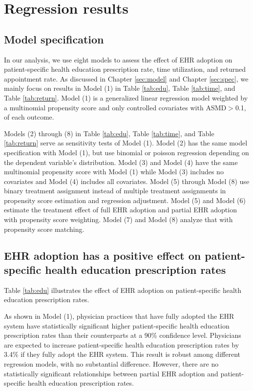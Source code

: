 \documentclass[12pt]{report}
\begin{document}
\chapter{Regression results}
\label{chapter: reg}

\section{Model specification}
In our analysis, we use eight models to assess the effect of EHR adoption on patient-specific health education prescription rate, time utilization, and returned appointment rate. As discussed in Chapter \ref{sec:model} and Chapter \ref{sec:spec}, we mainly focus on results in Model (1) in Table \ref{tab:edu}, Table \ref{tab:time}, and Table \ref{tab:return}. Model (1) is a generalized linear regression model weighted by a multinomial propensity score and only controlled covariates with ASMD$>$0.1, of each outcome. 

Models (2) through (8) in Table \ref{tab:edu}, Table \ref{tab:time}, and Table \ref{tab:return} serve as sensitivity tests of Model (1). Model (2) has the same model specification with Model (1), but use binomial or poisson regression depending on the dependent variable's distribution. Model (3) and Model (4) have the same multinomial propensity score with Model (1) while Model (3) includes no covariates and Model (4) includes all covariates. Model (5) through Model (8) use binary treatment assignment instead of multiple treatment assignments in propensity score estimation and regression adjustment. Model (5) and Model (6) estimate the treatment effect of full EHR adoption and partial EHR adoption with propensity score weighting. Model (7) and Model (8) analyze that with propensity score matching. 

\section{EHR adoption has a positive effect on patient-specific health education prescription rates}
Table \ref{tab:edu} illustrates the effect of EHR adoption on patient-specific health education prescription rates. 

As shown in Model (1), physician practices that have fully adopted the EHR system have statistically significant higher patient-specific health education prescription rates than their counterparts at a 90\% confidence level. Physicians are expected to increase patient-specific health education prescription rates by 3.4\% if they fully adopt the EHR system. This result is robust among different regression models, with no substantial difference. However, there are no statistically significant relationships between partial EHR adoption and patient-specific health education prescription rates. 
\end{document}
